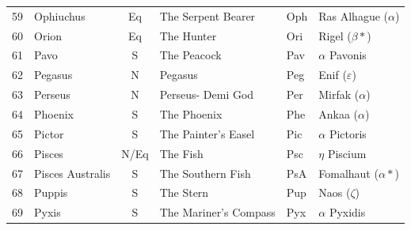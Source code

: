 \documentclass[a4paper,12pt]{extarticle}
\begin{document}
\begin{table}[H]
\begin{tabular}{llclll}
59                         & Ophiuchus                            & Eq                              & The Serpent Bearer                     & Oph                         & Ras Alhague ($\alpha$)                \\
60                         & Orion                                & Eq                              & The Hunter                             & Ori                         & Rigel ($\beta \ast$)                  \\
61                         & Pavo                                 & S                               & The Peacock                            & Pav                         & $\alpha$ Pavonis                      \\
62                         & Pegasus                              & N                               & Pegasus                                & Peg                         & Enif ($\varepsilon$)                  \\
63                         & Perseus                              & N                               & Perseus- Demi God                      & Per                         & Mirfak ($\alpha$)                     \\
64                         & Phoenix                              & S                               & The Phoenix                            & Phe                         & Ankaa ($\alpha$)                      \\
65                         & Pictor                               & S                               & The Painter’s Easel                    & Pic                         & $\alpha$ Pictoris                     \\
66                         & Pisces                               & N/Eq                            & The Fish                               & Psc                         & $\eta$ Piscium                        \\
67                         & Pisces Australis                     & S                               & The Southern Fish                      & PsA                         & Fomalhaut ($\alpha\ast$)              \\
68                         & Puppis                               & S                               & The Stern                              & Pup                         & Naos ($\zeta$)                        \\
69                         & Pyxis                                & S                               & The Mariner’s Compass                  & Pyx                         & $\alpha$ Pyxidis                      \\

\end{tabular}
\end{table}
\end{document}
